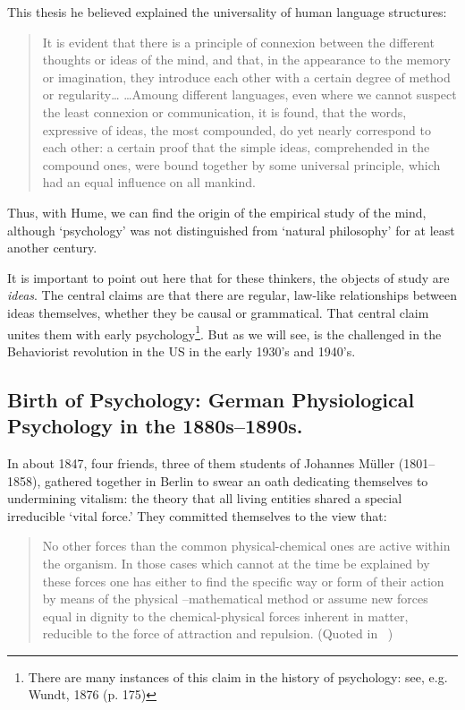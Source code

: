 \begin{refsection}
This thesis he believed explained the universality of human language structures:

\begin{quote}

It is evident that there is a principle of connexion between the different thoughts or ideas of the mind, and that, in the appearance to the memory or imagination, they introduce each other with a certain degree of method or regularity{\ldots} {\ldots}Amoung different languages, even where we cannot suspect the least connexion or communication, it is found, that the words, expressive of ideas, the most compounded, do yet nearly correspond to each other: a certain proof that the simple ideas, comprehended in the compound ones, were bound together by some universal principle, which had an equal influence on all mankind.
\end{quote}

Thus, with Hume, we can find the origin of the empirical study of the mind, although `psychology' was not distinguished from `natural philosophy' for at least another century.

It is important to point out here that for these thinkers, the objects of study are \emph{ideas}. The central claims are that there are regular, law-like relationships between ideas themselves, whether they be causal or grammatical. That central claim unites them with early psychology\footnote{There are many instances of this claim in the history of psychology: see, e.g. Wundt, 1876 (p. 175)}. But as we will see, is the challenged in the Behaviorist revolution in the US in the early 1930's and 1940's.

\subsection{Birth of Psychology: German Physiological Psychology in the 1880s--1890s.}
\label{birthofpsychology:germanphysiologicalpsychologyinthe1880s-1890s.}

In about 1847, four friends, three of them students of Johannes Müller (1801--1858), gathered together in Berlin to swear an oath dedicating themselves to undermining vitalism: the theory that all living entities shared a special irreducible `vital force.' They committed themselves to the view that:

\begin{quote}

No other forces than the common physical-chemical ones are active within the organism. In those cases which cannot at the time be explained by these forces one has either to find the specific way or form of their action by means of the physical –mathematical method or assume new forces equal in dignity to the chemical-physical forces inherent in matter, reducible to the force of attraction and repulsion. (Quoted in ~\citep{Bernfeld:1949ji})
\end{quote}


\end{refsection}
